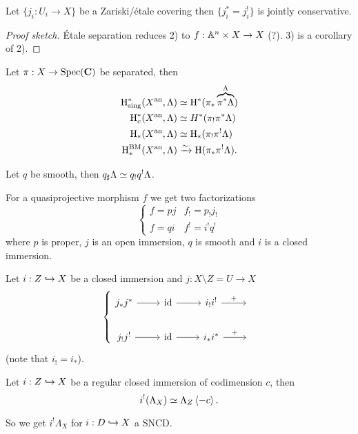 \begin{exercise}
	Let $\{j_i:U_i\to X\} $ be a Zariski/\'etale covering then $\{j_i^{*}=j_i^{!}\} $ is jointly conservative.
\end{exercise}
\begin{proof}[Proof sketch]
	\'Etale separation reduces 2) to $f:\Aff^{n}\times X\to X$ (?). 3) is a corollary of 2).
\end{proof}
\begin{proposition}
	Let $\pi:X\to \Spec(\bb{C})$ be separated, then
	\begin{align*}
		\mathrm{H}_{\text{sing}}^{*}(X^\text{an},\Lambda) &\simeq \mathrm{H}^{*}(\pi_*\overbrace{\pi^{*}\Lambda}^{\Lambda}) \\
		\mathrm{H}_c^{*}(X^\text{an}, \Lambda) &\simeq H^{*}(\pi_!\pi^{*}\Lambda) \\
		\mathrm{H}_*(X^\text{an}, \Lambda) &\simeq \mathrm{H}_*(\pi_!\pi^{!}\Lambda) \\
		\mathrm{H}_*^{\text{BM}}(X^\text{an},\Lambda) &\xrightarrow{\sim} \mathrm{H}(\pi_*\pi^{!}\Lambda).
	\end{align*}
\end{proposition}
\begin{remark}
	Let $q$ be smooth, then $q_\sharp\Lambda\simeq q_!q^{!}\Lambda$.
\end{remark}
For a quasiprojective morphism $f$ we get two factorizations
\[
\begin{cases}
	f = pj & f_! = p_!j_! \\
	f = qi & f^! = i^!q^!
\end{cases}
\] 
where $p$ is proper, $j$ is an open immersion, $q$ is smooth and $i$ is a closed immersion.

\begin{proposition}
	Let $i:Z\hookrightarrow X$ be a closed immersion and $j:X\setminus Z=U\to X$ 
	\[
	\left\{ 
	\begin{tikzcd}
		j_{*}j^{*} \ar[r] & \id \ar[r] & i_!i^{!} \ar[r,"+"] & {} \\
		j_!j^{!} \ar[r] & \id \ar[r] & i_* i^{*} \ar[r,"+"] & {}
	\end{tikzcd}
	\right.
	\] 
	(note that $i_! = i_*$).
\end{proposition}
\begin{proposition}
	Let $i:Z\hookrightarrow X$ be a regular closed immersion of codimension $c$, then
	\[
	i^{!}(\Lambda_X) \simeq \Lambda_Z \left<-c \right>.
	\] 
\end{proposition}
So we get $i^{!}\Lambda_X$ for $i:D\hookrightarrow X$ a SNCD.

